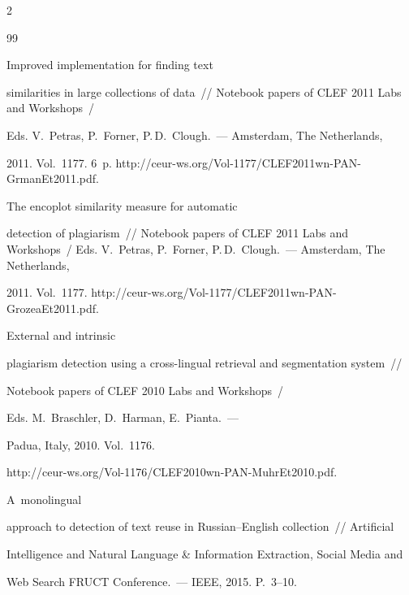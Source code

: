 \begin{multicols}{2}
{{\begin{thebibliography}{99}


 Improved implementation for finding text 


similarities in large collections of data~// Notebook papers of CLEF 2011 Labs and Workshops~/ 


Eds. V.~Petras, P.~Forner, P.\,D.~Clough.~--- Amsterdam, The Netherlands, 


2011. Vol.~1177. 6~p. {\sf http://ceur-ws.org/Vol-1177/CLEF2011wn-PAN-GrmanEt2011.pdf}.







 The encoplot similarity measure for automatic 


detection of plagiarism~// Notebook papers of CLEF 2011 Labs and Workshops~/ Eds. V.~Petras, P.~Forner, P.\,D.~Clough.~--- Amsterdam, The Netherlands, 


2011. Vol.~1177. {\sf http://ceur-ws.org/Vol-1177/CLEF2011wn-PAN-GrozeaEt2011.pdf}. 







 External and intrinsic 


plagiarism detection using a cross-lingual retrieval and segmentation system~// 


Notebook papers of CLEF 2010 Labs and Workshops~/


Eds. M.~Braschler, D.~Harman, E.~Pianta.~---


Padua, Italy, 2010. Vol.~1176.


{\sf http://ceur-ws.org/Vol-1176/CLEF2010wn-PAN-MuhrEt2010.pdf}.







 A~monolingual 


approach to detection of text reuse in Russian--English collection~// Artificial 


Intelligence and Natural Language \& Information Extraction, Social Media and 


Web Search FRUCT Conference.~--- IEEE, 2015. P.~3--10.








\end{thebibliography}}}
\end{multicols}
